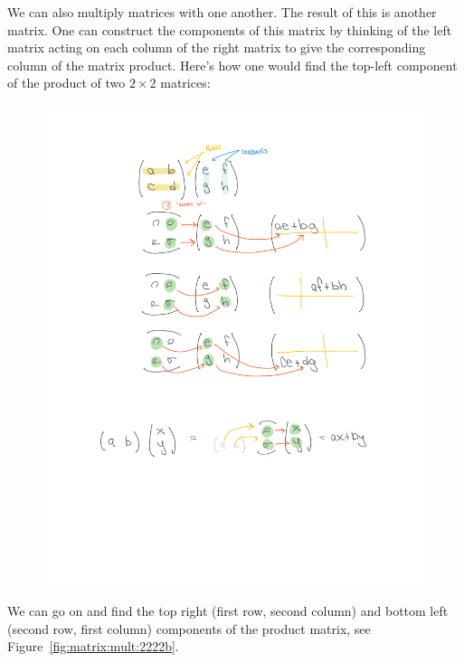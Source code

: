 We can also multiply matrices with one another. The result of this is another matrix. One can construct the components of this matrix by thinking of the left matrix acting on each column of the right matrix to give the corresponding column of the matrix product. Here's how one would find the top-left component of the product of two $2\times 2$ matrices:
\begin{figure}[ht]
    \centering
    \includegraphics[width=.8\textwidth]{figures/MatrixMult_2222a.pdf}
\end{figure}
We can go on and find the top right (first row, second column) and bottom left (second row, first column) components of the product matrix, see Figure~\ref{fig:matrix:mult:2222b}.
